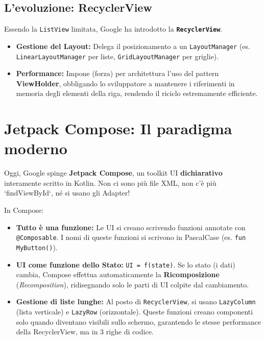 \subsection{L'evoluzione: RecyclerView}
Essendo la \texttt{ListView} limitata, Google ha introdotto la \textbf{\texttt{RecyclerView}}.
\begin{itemize}
    \item \textbf{Gestione del Layout:} Delega il posizionamento a un \texttt{LayoutManager} (es. \texttt{LinearLayoutManager} per liste, \texttt{GridLayoutManager} per griglie).
    \item \textbf{Performance:} Impone (forza) per architettura l'uso del pattern \textbf{ViewHolder}, obbligando lo sviluppatore a mantenere i riferimenti in memoria degli elementi della riga, rendendo il riciclo estremamente efficiente.
\end{itemize}

\section{Jetpack Compose: Il paradigma moderno}
Oggi, Google spinge \textbf{Jetpack Compose}, un toolkit UI \textbf{dichiarativo} interamente scritto in Kotlin.
Non ci sono più file XML, non c'è più `findViewById`, né si usano gli Adapter!

In Compose:
\begin{itemize}
    \item \textbf{Tutto è una funzione:} Le UI si creano scrivendo funzioni annotate con \texttt{@Composable}.
    I nomi di queste funzioni si scrivono in PascalCase (es. \texttt{fun MyButton()}).
    \item \textbf{UI come funzione dello Stato:} \texttt{UI = f(state)}.
    Se lo stato (i dati) cambia, Compose effettua automaticamente la \textbf{Ricomposizione} (\textit{Recomposition}), ridisegnando solo le parti di UI colpite dal cambiamento.
    \item \textbf{Gestione di liste lunghe:} Al posto di \texttt{RecyclerView}, si usano \texttt{LazyColumn} (lista verticale) e \texttt{LazyRow} (orizzontale).
    Queste funzioni creano componenti solo quando diventano visibili sullo schermo, garantendo le stesse performance della RecyclerView, ma in 3 righe di codice.
\end{itemize}

